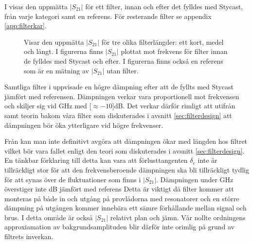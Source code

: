 \documentclass[main.tex]{subfiles}
\begin{document}
I  visas den uppmätta $|S_{21}|$ för ett filter, innan och efter det fylldes med Stycast, från varje kategori samt en referens. För resterande filter se appendix \ref{app:filterkar}.

\begin{figure}[H]
    \centerfloat
    \begin{subfigure}[t]{0.329\textwidth}
        \centerfloat
        \setlength{}
        \setlength\figureheight{11em}
        
    \end{subfigure}
    \begin{subfigure}[t]{0.329\textwidth}
        \centerfloat
        \setlength{}
        \setlength\figureheight{11em}
        
    \end{subfigure}
    \begin{subfigure}[t]{0.329\textwidth}
        \centering
        \setlength{}
        \setlength\figureheight{11em}
        
    \end{subfigure}
    \caption{Visar den uppmätta $|S_{21}|$ för tre olika filterlängder: ett kort, medel och långt. I figurerna finns $|S_{21}|$ plottat mot frekvens för filter innan de fylldes med Stycast och efter. I figurerna finns också en referens som är en mätning av $|S_{21}|$ utan filter.}
    \label{fig:filter_kar}
\end{figure}

Samtliga filter i  uppvisade en högre dämpning efter att de fyllts med Stycast jämfört med referensen. Dämpningen verkar vara proportionell mot frekvensen och skiljer sig vid \unit[50]{GHz} med \unit[$\approx-10$]{dB}. Det verkar därför rimligt att utifrån  samt teorin bakom våra filter som diskuterades i avsnitt \ref{sec:filterdesign} att dämpningen bör öka ytterligare vid högre frekvenser.


Från  kan man inte definitivt avgöra att dämpningen ökar med längden hos filtret vilket bör vara fallet enligt den teori som diskuterades i avsnitt \ref{sec:filterdesign}. En tänkbar förklaring till detta kan vara att förlusttangenten $\delta_e$ inte är tillräckligt stor för att den frekvensberoende dämpningen ska bli tillräckligt tydlig för att synas över de fluktuationer som finns i $|S_{21}|$.%
Dämpningen under \unit[10]{GHz} överstiger inte \unit[3]{dB} jämfört med referens Detta är viktigt då filter kommer att monteras på både in och utgång på provlådorna med resonatorer och en större dämpning på utgången kommer innebära ett sämre förhållande mellan signal och brus. I detta område är också $|S_{21}|$ relativt plan och jämn. Vår nollte ordningens approxiamation av bakgrundsamplituden blir därför inte orimlig på grund av filtrets inverkan.
\end{document}
